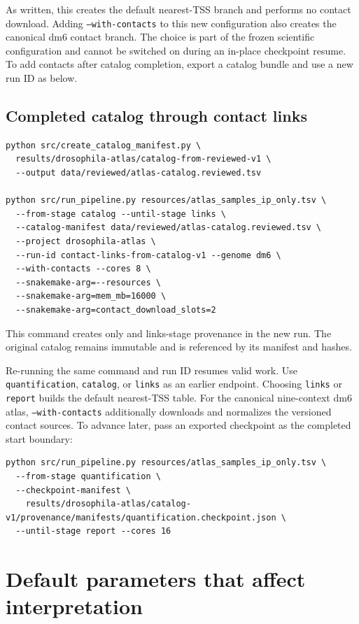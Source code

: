 \documentclass[11pt]{article}
\newcommand{\stage}[1]{\texttt{#1}}
\newcommand{\filep}[1]{\path{#1}}
\begin{document}
As written, this creates the default nearest-TSS branch and performs no
contact download.  Adding \texttt{--with-contacts} to this new configuration
also creates the canonical dm6 contact branch.  The choice is part of the
frozen scientific configuration and cannot be switched on during an in-place
checkpoint resume.  To add contacts after catalog completion, export a catalog
bundle and use a new run ID as below.

\subsection{Completed catalog through contact links}

\begin{lstlisting}
python src/create_catalog_manifest.py \
  results/drosophila-atlas/catalog-from-reviewed-v1 \
  --output data/reviewed/atlas-catalog.reviewed.tsv

python src/run_pipeline.py resources/atlas_samples_ip_only.tsv \
  --from-stage catalog --until-stage links \
  --catalog-manifest data/reviewed/atlas-catalog.reviewed.tsv \
  --project drosophila-atlas \
  --run-id contact-links-from-catalog-v1 --genome dm6 \
  --with-contacts --cores 8 \
  --snakemake-arg=--resources \
  --snakemake-arg=mem_mb=16000 \
  --snakemake-arg=contact_download_slots=2
\end{lstlisting}

This command creates only \filep{activity/links/} and links-stage provenance in
the new run.  The original catalog remains immutable and is referenced by its
manifest and hashes.

Re-running the same command and run ID resumes valid work.  Use
\stage{quantification}, \stage{catalog}, or \stage{links} as an earlier
endpoint.  Choosing \stage{links} or \stage{report} builds the default
nearest-TSS table.  For the canonical nine-context dm6 atlas,
\texttt{--with-contacts} additionally downloads and normalizes the versioned
contact sources.  To
advance later, pass an exported checkpoint as the completed start boundary:

\begin{lstlisting}
python src/run_pipeline.py resources/atlas_samples_ip_only.tsv \
  --from-stage quantification \
  --checkpoint-manifest \
    results/drosophila-atlas/catalog-v1/provenance/manifests/quantification.checkpoint.json \
  --until-stage report --cores 16
\end{lstlisting}

\section{Default parameters that affect interpretation}
\end{document}
